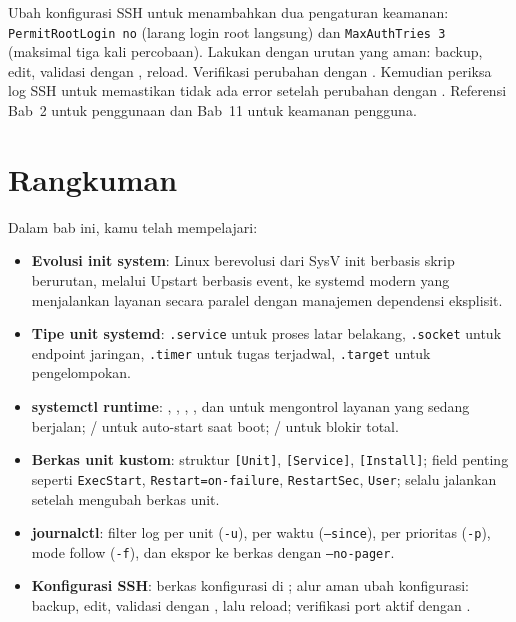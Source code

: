 \begin{challengebox}
Ubah konfigurasi SSH untuk menambahkan dua pengaturan keamanan: \texttt{PermitRootLogin no} (larang login root langsung) dan \texttt{MaxAuthTries 3} (maksimal tiga kali percobaan). Lakukan dengan urutan yang aman: backup, edit, validasi dengan , reload. Verifikasi perubahan dengan . Kemudian periksa log SSH untuk memastikan tidak ada error setelah perubahan dengan . Referensi Bab~2 untuk penggunaan  dan Bab~11 untuk keamanan pengguna.
\end{challengebox}

\section{Rangkuman}
\label{sec:service-summary}

Dalam bab ini, kamu telah mempelajari:

\begin{itemize}[noitemsep,topsep=2pt]
    \item \textbf{Evolusi init system}: Linux berevolusi dari SysV init berbasis skrip berurutan, melalui Upstart berbasis event, ke systemd modern yang menjalankan layanan secara paralel dengan manajemen dependensi eksplisit.
    \item \textbf{Tipe unit systemd}: \texttt{.service} untuk proses latar belakang, \texttt{.socket} untuk endpoint jaringan, \texttt{.timer} untuk tugas terjadwal, \texttt{.target} untuk pengelompokan.
    \item \textbf{systemctl runtime}: , , , , dan  untuk mengontrol layanan yang sedang berjalan; / untuk auto-start saat boot; / untuk blokir total.
    \item \textbf{Berkas unit kustom}: struktur \texttt{[Unit]}, \texttt{[Service]}, \texttt{[Install]}; field penting seperti \texttt{ExecStart}, \texttt{Restart=on-failure}, \texttt{RestartSec}, \texttt{User}; selalu jalankan  setelah mengubah berkas unit.
    \item \textbf{journalctl}: filter log per unit (\texttt{-u}), per waktu (\texttt{--since}), per prioritas (\texttt{-p}), mode follow (\texttt{-f}), dan ekspor ke berkas dengan \texttt{--no-pager}.
    \item \textbf{Konfigurasi SSH}: berkas konfigurasi di ; alur aman ubah konfigurasi: backup, edit, validasi dengan , lalu reload; verifikasi port aktif dengan .
\end{itemize}

